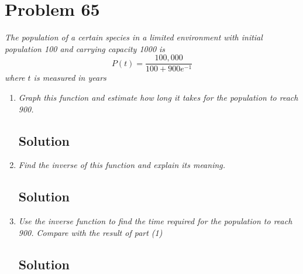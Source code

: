 \documentclass[11pt]{article}
\newcommand{\soln}{\subsection*}
\newcommand{\qn}{\textit}
\begin{document}
\section*{Problem 65}

\qn{The population of a certain species in a limited environment with initial population 100 and carrying capacity 1000 is $$P(t)=\frac{100,000}{100+900e^{-1}}$$ where $t$ is measured in years}
\begin{enumerate}
	\item \qn{Graph this function and estimate how long it takes for the population to reach 900.}
	\soln{Solution}
	
	\item \qn{Find the inverse of this function and explain its meaning.}
	\soln{Solution}
	
	\item \qn{Use the inverse function to find the time required for the population to reach 900. Compare with the result of part (1)}
	\soln{Solution}
\end{enumerate}
\end{document}
